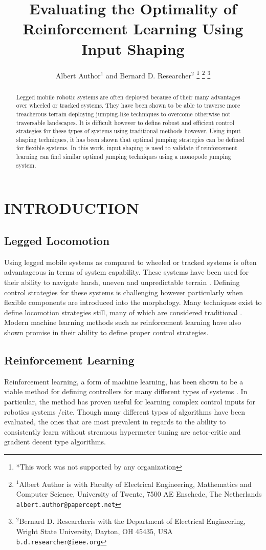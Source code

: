 \documentclass[letterpaper, 10 pt, conference]{ieeeconf}  %
\title{\LARGE \bf
Evaluating the Optimality of Reinforcement Learning Using Input Shaping
}
\author{Albert Author$^{1}$ and Bernard D. Researcher$^{2}$%
\thanks{*This work was not supported by any organization}%
\thanks{$^{1}$Albert Author is with Faculty of Electrical Engineering, Mathematics and Computer Science,
        University of Twente, 7500 AE Enschede, The Netherlands
        {\tt\small albert.author@papercept.net}}%
\thanks{$^{2}$Bernard D. Researcheris with the Department of Electrical Engineering, Wright State University,
        Dayton, OH 45435, USA
        {\tt\small b.d.researcher@ieee.org}}%
}
\begin{document}
\maketitle
\thispagestyle{empty}
\pagestyle{empty}


\begin{abstract}

Legged mobile robotic systems are often deployed because of their many advantages over wheeled or tracked systems. They have been shown to be able to traverse more treacherous terrain deploying jumping-like techniques to overcome otherwise not traversable landscapes. It is difficult however to define robust and efficient control strategies for these types of systems using traditional methods however. Using input shaping techniques, it has been shown that optimal jumping strategies can be defined for flexible systems. In this work, input shaping is used to validate if reinforcement learning can find similar optimal jumping techniques using a monopode jumping system.

\end{abstract}


\section{INTRODUCTION}
\subsection{Legged Locomotion}

Using legged mobile systems as compared to wheeled or tracked systems is often advantageous in terms of system capability. These systems have been used for their ability to navigate harsh, uneven and unpredictable terrain \cite{}. Defining control strategies for these systems is challenging however particularly when flexible components are introduced into the morphology. Many techniques exist to define locomotion strategies still, many of which are considered traditional \cite{}. Modern machine learning methods such as reinforcement learning have also shown promise in their ability to define proper control strategies.

\subsection{Reinforcement Learning}
Reinforcement learning, a form of machine learning, has been shown to be a viable method for defining controllers for many different types of systems \cite{}. In particular, the method has proven useful for learning complex control inputs for robotics systems /cite{}. Though many different types of algorithms have been evaluated, the ones that are most prevalent in regards to the ability to consistently learn without strenuous hypermeter tuning are actor-critic and gradient decent type algorithms. 
\end{document}
